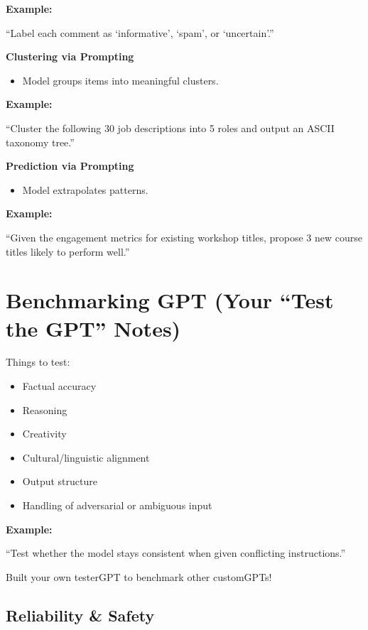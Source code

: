 \documentclass[
  letterpaper,
  DIV=11,
  numbers=noendperiod]{scrreprt}
\providecommand{\tightlist}{%
  \setlength{\itemsep}{0pt}\setlength{\parskip}{0pt}}
\begin{document}
\textbf{Example:}

``Label each comment as `informative', `spam', or `uncertain'.''

\textbf{Clustering via Prompting}

\begin{itemize}
\tightlist
\item
  Model groups items into meaningful clusters.
\end{itemize}

\textbf{Example:}

``Cluster the following 30 job descriptions into 5 roles and output an
ASCII taxonomy tree.''

\textbf{Prediction via Prompting}

\begin{itemize}
\tightlist
\item
  Model extrapolates patterns.
\end{itemize}

\textbf{Example:}

``Given the engagement metrics for existing workshop titles, propose 3
new course titles likely to perform well.''

\section{Benchmarking GPT (Your ``Test the GPT''
Notes)}\label{benchmarking-gpt-your-test-the-gpt-notes}

Things to test:

\begin{itemize}
\tightlist
\item
  Factual accuracy
\item
  Reasoning
\item
  Creativity
\item
  Cultural/linguistic alignment
\item
  Output structure
\item
  Handling of adversarial or ambiguous input
\end{itemize}

\textbf{Example:}

``Test whether the model stays consistent when given conflicting
instructions.''

Built your own testerGPT to benchmark other customGPTs!

\subsection{Reliability \& Safety}\label{reliability-safety}
\end{document}

